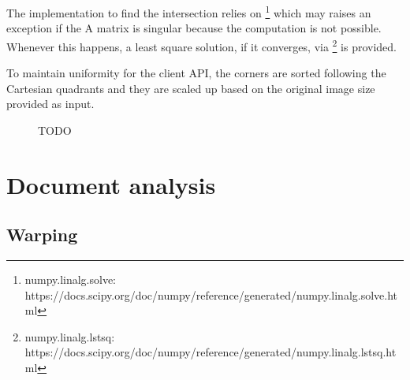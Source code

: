 \documentclass[a4paper]{article}
\begin{document}
The implementation to find the intersection relies on \footnote{ numpy.linalg.solve: https://docs.scipy.org/doc/numpy/reference/generated/numpy.linalg.solve.html} which may raises an exception if the A matrix is singular because the computation is not possible. Whenever this happens, a least square solution, if it converges, via \footnote{numpy.linalg.lstsq: https://docs.scipy.org/doc/numpy/reference/generated/numpy.linalg.lstsq.html} is provided.

To maintain uniformity for the client API, the corners are sorted following the Cartesian quadrants and they are scaled up based on the original image size provided as input.

\begin{figure}[H]
	\caption{TODO}
	\label{fig:computingcorners}
\end{figure}

\section{Document analysis}

\subsection{Warping}
\end{document}

